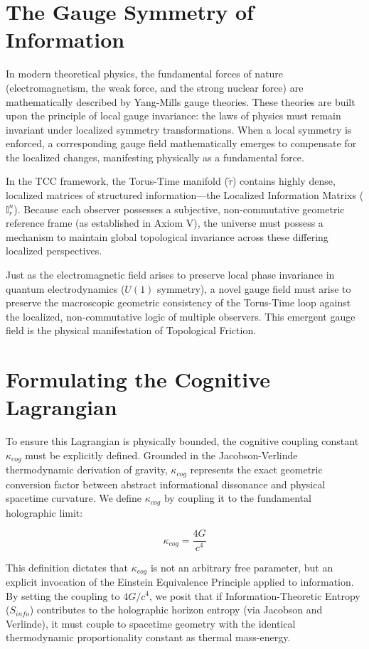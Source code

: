 \documentclass[12pt,openany]{book}
\theoremstyle{plain}
\theoremstyle{definition}
\theoremstyle{remark}
\begin{document}
\section{The Gauge Symmetry of Information}

In modern theoretical physics, the fundamental forces of nature (electromagnetism, the weak force, and the strong nuclear force) are mathematically described by Yang-Mills gauge theories. These theories are built upon the principle of local gauge invariance: the laws of physics must remain invariant under localized symmetry transformations. When a local symmetry is enforced, a corresponding gauge field mathematically emerges to compensate for the localized changes, manifesting physically as a fundamental force.

In the TCC framework, the Torus-Time manifold ($\tilde{\tau}$) contains highly dense, localized matrices of structured information—the Localized Information Matrixs ($\mathbb{I}_r^n$). Because each observer possesses a subjective, non-commutative geometric reference frame (as established in Axiom V), the universe must possess a mechanism to maintain global topological invariance across these differing localized perspectives. 

Just as the electromagnetic field arises to preserve local phase invariance in quantum electrodynamics ($U(1)$ symmetry), a novel gauge field must arise to preserve the macroscopic geometric consistency of the Torus-Time loop against the localized, non-commutative logic of multiple observers. This emergent gauge field is the physical manifestation of Topological Friction.

\section{Formulating the Cognitive Lagrangian}

To ensure this Lagrangian is physically bounded, the cognitive coupling constant $\kappa_{cog}$ must be explicitly defined. Grounded in the Jacobson-Verlinde thermodynamic derivation of gravity, $\kappa_{cog}$ represents the exact geometric conversion factor between abstract informational dissonance and physical spacetime curvature. We define $\kappa_{cog}$ by coupling it to the fundamental holographic limit:

\begin{equation}
\kappa_{cog} = \frac{4G}{c^4}
\end{equation}

This definition dictates that $\kappa_{cog}$ is not an arbitrary free parameter, but an explicit invocation of the Einstein Equivalence Principle applied to information. By setting the coupling to $4G/c^4$, we posit that if Information-Theoretic Entropy ($S_{info}$) contributes to the holographic horizon entropy (via Jacobson and Verlinde), it must couple to spacetime geometry with the identical thermodynamic proportionality constant as thermal mass-energy.
\end{document}
